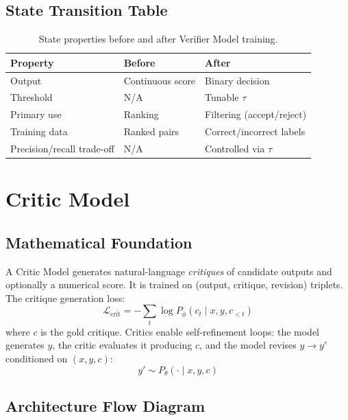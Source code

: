 \subsection{State Transition Table}
\begin{table}[h]\centering
\begin{tabular}{lll}\toprule
\textbf{Property} & \textbf{Before} & \textbf{After}\\\midrule
Output & Continuous score & Binary decision\\
Threshold & N/A & Tunable $\tau$\\
Primary use & Ranking & Filtering (accept/reject)\\
Training data & Ranked pairs & Correct/incorrect labels\\
Precision/recall trade-off & N/A & Controlled via $\tau$\\\bottomrule
\end{tabular}
\caption{State properties before and after Verifier Model training.}
\end{table}

\newpage
\section{Critic Model}

\subsection{Mathematical Foundation}
A Critic Model generates natural-language \emph{critiques} of candidate outputs and optionally a numerical score. It is trained on (output, critique, revision) triplets. The critique generation loss:
\begin{equation}
  \mathcal{L}_{\text{crit}} = -\sum_t \log P_\phi(c_t \mid x, y, c_{<t})
\end{equation}
where $c$ is the gold critique. Critics enable self-refinement loops: the model generates $y$, the critic evaluates it producing $c$, and the model revises $y \to y'$ conditioned on $(x, y, c)$:
\begin{equation}
  y' \sim P_\theta(\cdot \mid x, y, c)
\end{equation}

\subsection{Architecture Flow Diagram}

